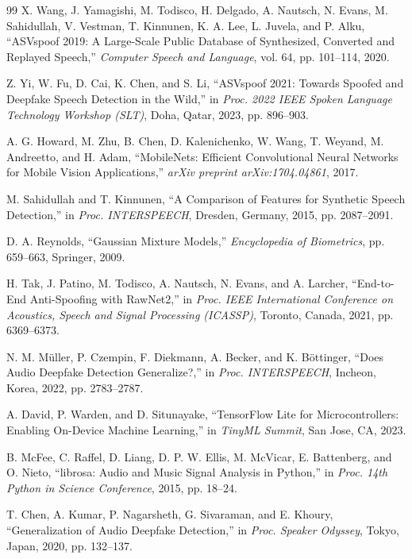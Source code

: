 \documentclass[12pt,a4paper,titlepage]{report}
\begin{document}
	\begin{thebibliography}{99}
	 X. Wang, J. Yamagishi, M. Todisco, H. Delgado, A. Nautsch, N. Evans, M. Sahidullah, V. Vestman, T. Kinnunen, K. A. Lee, L. Juvela, and P. Alku, ``ASVspoof 2019: A Large-Scale Public Database of Synthesized, Converted and Replayed Speech,'' \textit{Computer Speech and Language}, vol. 64, pp. 101--114, 2020.
	
	 Z. Yi, W. Fu, D. Cai, K. Chen, and S. Li, ``ASVspoof 2021: Towards Spoofed and Deepfake Speech Detection in the Wild,'' in \textit{Proc. 2022 IEEE Spoken Language Technology Workshop (SLT)}, Doha, Qatar, 2023, pp. 896--903.
	
	 A. G. Howard, M. Zhu, B. Chen, D. Kalenichenko, W. Wang, T. Weyand, M. Andreetto, and H. Adam, ``MobileNets: Efficient Convolutional Neural Networks for Mobile Vision Applications,'' \textit{arXiv preprint arXiv:1704.04861}, 2017.
	
	 M. Sahidullah and T. Kinnunen, ``A Comparison of Features for Synthetic Speech Detection,'' in \textit{Proc. INTERSPEECH}, Dresden, Germany, 2015, pp. 2087--2091.
	
	 D. A. Reynolds, ``Gaussian Mixture Models,'' \textit{Encyclopedia of Biometrics}, pp. 659--663, Springer, 2009.
	
	 H. Tak, J. Patino, M. Todisco, A. Nautsch, N. Evans, and A. Larcher, ``End-to-End Anti-Spoofing with RawNet2,'' in \textit{Proc. IEEE International Conference on Acoustics, Speech and Signal Processing (ICASSP)}, Toronto, Canada, 2021, pp. 6369--6373.
	
	 N. M. M\"{u}ller, P. Czempin, F. Diekmann, A. Becker, and K. B\"{o}ttinger, ``Does Audio Deepfake Detection Generalize?,'' in \textit{Proc. INTERSPEECH}, Incheon, Korea, 2022, pp. 2783--2787.
	
	 A. David, P. Warden, and D. Situnayake, ``TensorFlow Lite for Microcontrollers: Enabling On-Device Machine Learning,'' in \textit{TinyML Summit}, San Jose, CA, 2023.
	
	 B. McFee, C. Raffel, D. Liang, D. P. W. Ellis, M. McVicar, E. Battenberg, and O. Nieto, ``librosa: Audio and Music Signal Analysis in Python,'' in \textit{Proc. 14th Python in Science Conference}, 2015, pp. 18--24.
	
	 T. Chen, A. Kumar, P. Nagarsheth, G. Sivaraman, and E. Khoury, ``Generalization of Audio Deepfake Detection,'' in \textit{Proc. Speaker Odyssey}, Tokyo, Japan, 2020, pp. 132--137.
	
	\end{thebibliography}
	
\end{document}
